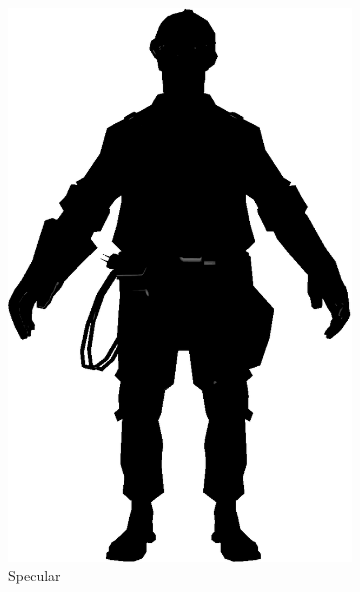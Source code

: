 \begin{figure}[h]
\begin{subfigure}[b]{0.18\textwidth}
        \includegraphics[width=\textwidth]{img/Lighting/specular.png}
        \caption{Specular}
        \label{fig:specular}
    \end{subfigure}
    ~
    \centering
    \begin{subfigure}[b]{0.18\textwidth}

\end{subfigure}
\end{figure}
